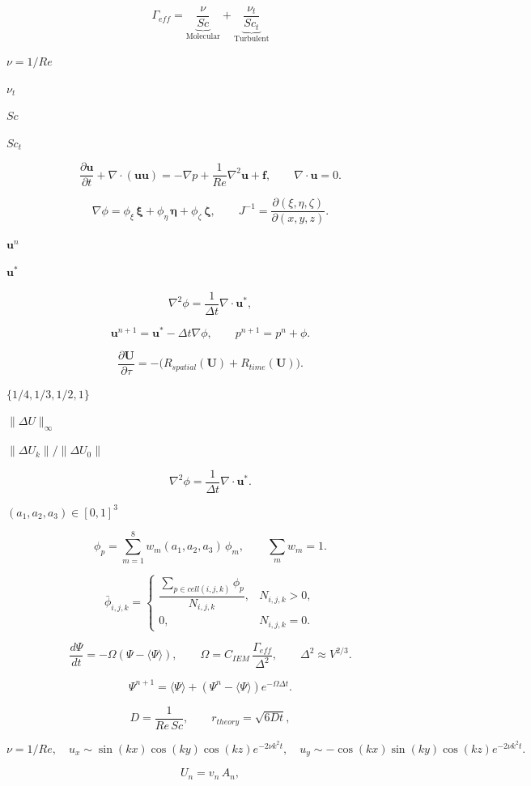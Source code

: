 \documentclass{article}
\begin{document}
\[
   \Gamma_{eff} = \underbrace{\frac{\nu}{Sc}}_{\text{Molecular}} + \underbrace{\frac{\nu_t}{Sc_t}}_{\text{Turbulent}}
\]
\pagebreak

$ \nu = 1/Re $
\pagebreak

$ \nu_t $
\pagebreak

$ Sc $
\pagebreak

$ Sc_t $
\pagebreak

\[
\frac{\partial \mathbf{u}}{\partial t} + \nabla\cdot(\mathbf{u}\mathbf{u}) = -\nabla p + \frac{1}{Re}\nabla^2\mathbf{u} + \mathbf{f},
\qquad
\nabla\cdot\mathbf{u}=0.
\]
\pagebreak

\[
\nabla \phi = \phi_{\xi}\,\mathbf{\xi} + \phi_{\eta}\,\mathbf{\eta} + \phi_{\zeta}\,\mathbf{\zeta},
\qquad
J^{-1} = \frac{\partial(\xi,\eta,\zeta)}{\partial(x,y,z)}.
\]
\pagebreak

$\mathbf{u}^n$
\pagebreak

$\mathbf{u}^*$
\pagebreak

\[
\nabla^2 \phi = \frac{1}{\Delta t}\nabla\cdot\mathbf{u}^*,
\]
\pagebreak

\[
\mathbf{u}^{n+1} = \mathbf{u}^* - \Delta t\nabla\phi,
\qquad
p^{n+1}=p^n+\phi.
\]
\pagebreak

\[
\frac{\partial \mathbf{U}}{\partial \tau} = -\Big(R_{spatial}(\mathbf{U}) + R_{time}(\mathbf{U})\Big).
\]
\pagebreak

$\{1/4,1/3,1/2,1\}$
\pagebreak

$\|\Delta U\|_\infty$
\pagebreak

$\|\Delta U_k\|/\|\Delta U_0\|$
\pagebreak

\[
\nabla^2 \phi = \frac{1}{\Delta t}\nabla\cdot\mathbf{u}^*.
\]
\pagebreak

$(a_1,a_2,a_3)\in[0,1]^3$
\pagebreak

\[
\phi_p = \sum_{m=1}^{8} w_m(a_1,a_2,a_3)\,\phi_m,
\qquad
\sum_m w_m = 1.
\]
\pagebreak

\[
\bar{\phi}_{i,j,k} =
\begin{cases}
\dfrac{\sum_{p\in cell(i,j,k)} \phi_p}{N_{i,j,k}}, & N_{i,j,k}>0, \\
0, & N_{i,j,k}=0.
\end{cases}
\]
\pagebreak

\[
\frac{d\Psi}{dt} = -\Omega(\Psi-\langle\Psi\rangle),
\qquad
\Omega = C_{IEM}\,\frac{\Gamma_{eff}}{\Delta^2},
\qquad
\Delta^2\approx V^{2/3}.
\]
\pagebreak

\[
\Psi^{n+1}=\langle\Psi\rangle + (\Psi^n-\langle\Psi\rangle)e^{-\Omega\Delta t}.
\]
\pagebreak

\[
D = \frac{1}{Re\,Sc},
\qquad
r_{theory} = \sqrt{6Dt},
\]
\pagebreak

\[
\nu = 1/Re, \quad
u_x \sim \sin(kx)\cos(ky)\cos(kz)e^{-2\nu k^2 t},
\quad
u_y \sim -\cos(kx)\sin(ky)\cos(kz)e^{-2\nu k^2 t}.
\]
\pagebreak

\[
U_n = v_n\,A_n,
\]
\pagebreak
\end{document}
